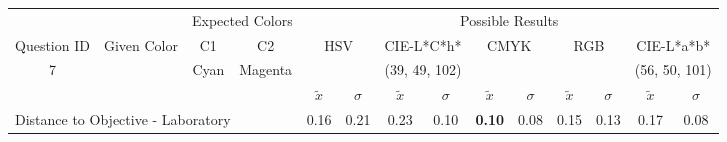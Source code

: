 %
\begin{table}[H]
  \resizebox{\textwidth}{!} {
  \begin{tabular}{lccccccccccccc}
    \hline
    \multicolumn{1}{c}{}                              &                                      & \multicolumn{2}{c}{Expected Colors}                   & \multicolumn{10}{c}{Possible Results}                                                                                                                                                                                                                                                                                        \\ \cline{3-14}
    \multicolumn{1}{c}{\multirow{-2}{*}{Question ID}} & \multirow{-2}{*}{Given Color}        & C1                       & C2                         & \multicolumn{2}{c}{HSV}                                        & \multicolumn{2}{c}{CIE-L*C*h*}                                 & \multicolumn{2}{c}{CMYK}                                       & \multicolumn{2}{c}{RGB}                                        & \multicolumn{2}{c}{CIE-L*a*b*}                                 \\ \hline
    \multicolumn{1}{c}{7}                             & \cellcolor[HTML]{0000FF}{\color[HTML]{FFFFFF}(18, 7, 95)} & \multicolumn{1}{c|}{Cyan} & \multicolumn{1}{c|}{Magenta}  & \multicolumn{2}{c|}{\cellcolor[HTML]{0000FF}{\color[HTML]{FFFFFF}(18, 7, 95)}}      & \multicolumn{2}{c|}{\cellcolor[HTML]{00CAFF}(39, 49, 102)}       & \multicolumn{2}{c|}{\cellcolor[HTML]{8080FF}{\color[HTML]{FFFFFF}(35, 27, 98)}}       & \multicolumn{2}{c|}{\cellcolor[HTML]{8080FF}{\color[HTML]{FFFFFF}(35, 27, 98)}}       & \multicolumn{2}{c|}{\cellcolor[HTML]{C6AEFF}(56, 50, 101)}       \\ \hline
                                                      & \multicolumn{1}{l}{}                 & \multicolumn{1}{l}{}     & \multicolumn{1}{l}{}       & \multicolumn{1}{c}{$\tilde{x}$} & \multicolumn{1}{c}{$\sigma$} & \multicolumn{1}{c}{$\tilde{x}$} & \multicolumn{1}{c}{$\sigma$} & \multicolumn{1}{c}{$\tilde{x}$} & \multicolumn{1}{c}{$\sigma$} & \multicolumn{1}{c}{$\tilde{x}$} & \multicolumn{1}{c}{$\sigma$} & \multicolumn{1}{c}{$\tilde{x}$} & \multicolumn{1}{c}{$\sigma$} \\ \hline
    \multicolumn{4}{l}{Distance to Objective - Laboratory}                                                                                           & \multicolumn{1}{|c}{0.16}       & \multicolumn{1}{c|}{0.21}    & \multicolumn{1}{|c}{0.23}       & \multicolumn{1}{c|}{0.10}    & \multicolumn{1}{|c}{\textbf{0.10}}       & \multicolumn{1}{c|}{0.08}    & \multicolumn{1}{|c}{0.15}       & \multicolumn{1}{c|}{0.13}    & \multicolumn{1}{|c}{0.17}       & \multicolumn{1}{c|}{0.08}    \\

\end{tabular}}
\end{table}
